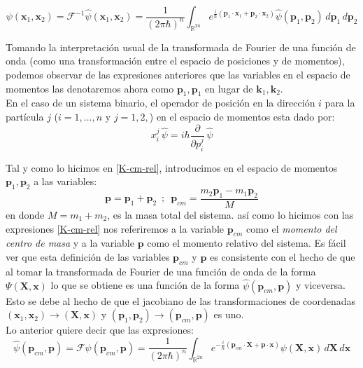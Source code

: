 \documentclass[12pt]{book}
\numberwithin{equation}{chapter}
\def\n{\noindent}
\def\R{\mathbb{R}}
\def\rar{\rightarrow}
\def\F{\mathcal{F}}
\def\x{\mathbf{x}}
\def\xx{\mathbf{X}}
\def\k{\mathbf{k}}
\def\P{\mathbf{p}}
\begin{document}
\begin{equation}\label{transi-uf}
\psi(\x_{1},\x_{2}) =\F^{-1} \hat{\psi}(\x_{1},\x_{2})= \frac{1}{(2\pi \hbar)^{n}} \int_{\R^{2n}} e^{\frac{i}{\hbar} ( \P_{1}\cdot \x_{1} + \P_{2}\cdot \x_{2} ) } \hat{\psi}(\P_{1},\P_{2}) \, d\P_{1}\, d\P_{2}
\end{equation}

\n Tomando la interpretaci\'on usual de la transformada de Fourier de una funci\'on de onda (como una transformaci\'on entre el espacio de posiciones y de momentos), podemos observar de las expresiones anteriores que las variables en el espacio de momentos las denotaremos ahora como $\P_{1},\P_{1}$ en lugar de $\k_{1},\k_{2}$.\\
En el caso de un sistema binario, el operador de posici\'on en la direcci\'on $i$ para la part\'icula $j$ ($i=1,\ldots,n$ y $j=1,2,$) en el espacio de momentos esta dado por:
$$ x_{i}^{j}\, \hat{\psi}=  i\hbar \frac{\partial }{\partial p_{i}^{j}} \, \hat{\psi}   $$
 
Tal y como lo hicimos en \eqref{K-cm-rel}, introducimos en el espacio de momentos $\P_{1},\P_{2}$ a las variables:
\begin{equation}\label{pr-pcm}
\P= \P_{1}+\P_{2} \,\,\,;\,\,\, \P_{cm}= \frac{ m_{2}\P_{1} - m_{1}\P_{2} }{M}
\end{equation}
en donde $M=m_{1}+m_{2}$, es la masa total del sistema. as\'i como lo hicimos con las expresiones \eqref{K-cm-rel} nos referiremos a la variable $\P_{cm}$ como el \emph{momento del centro de masa} y a la variable $\P$ como el momento relativo del sistema. Es f\'acil ver que esta definici\'on de las variables $\P_{cm}$ y $\P$ es consistente con el hecho de que al tomar la transformada de Fourier de una funci\'on de onda de la forma $\Psi (\xx,\x)$ lo que se obtiene es una funci\'on de la forma $\hat{\psi}(\P_{cm},\P)$ y viceversa. Esto se debe al hecho de que el jacobiano de las transformaciones de coordenadas $ (\x_{1} , \x_{2}) \rar (\xx , \x) $ y $ (\P_{1} , \P_{2}) \rar (\P_{cm} , \P) $ es uno.\\ 
Lo anterior quiere decir que las expresiones:
$$ \hat{\psi}(\P_{cm},\P) =\F \psi (\P_{cm},\P)= \frac{1}{(2\pi \hbar)^{n}} \int_{\R^{2n}} e^{-\frac{i}{\hbar} ( \P_{cm}\cdot \xx + \P\cdot \x ) } \psi(\xx,\x) \, d\xx \, d\x $$
\end{document}
